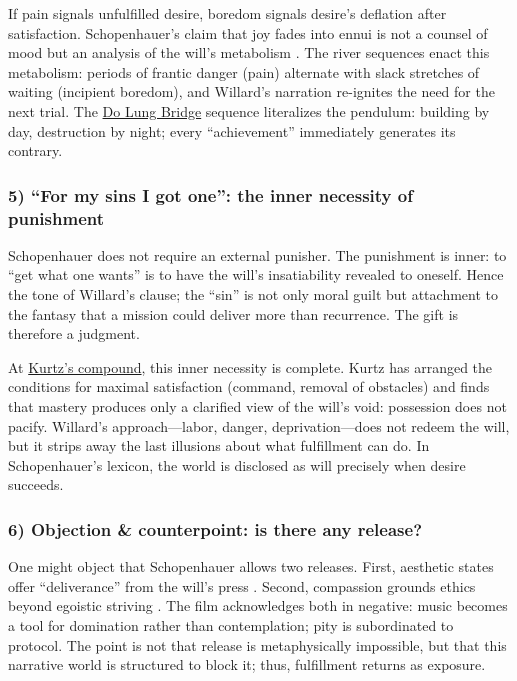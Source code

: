 If pain signals unfulfilled desire, boredom signals desire's deflation after satisfaction.
Schopenhauer's claim that joy fades into ennui is not a counsel of mood but an analysis
of the will's metabolism \parencite[pp.~312--320]{SchopenhauerWWR1969}. The river sequences
enact this metabolism: periods of frantic danger (pain) alternate with slack stretches of
waiting (incipient boredom), and Willard's narration re-ignites the need for the next trial.
The \hyperref[scene:do-lung-bridge]{Do Lung Bridge} sequence literalizes the pendulum:
building by day, destruction by night; every ``achievement'' immediately generates its
contrary.

\subsubsection*{5) ``For my sins I got one'': the inner necessity of punishment}

Schopenhauer does not require an external punisher. The punishment is inner: to ``get what one
wants'' is to have the will's insatiability revealed to oneself. Hence the tone of Willard's
clause; the ``sin'' is not only moral guilt but attachment to the fantasy that a mission could
deliver more than recurrence. The gift is therefore a judgment.

At \hyperref[scene:kurtz-compound]{Kurtz's compound}, this inner necessity is complete. Kurtz
has arranged the conditions for maximal satisfaction (command, removal of obstacles) and finds
that mastery produces only a
clarified view of the will's void: possession does not pacify. Willard's approach—labor, danger,
deprivation—does not redeem the will, but it strips away the last illusions about what
fulfillment can do. In Schopenhauer's lexicon, the world is disclosed as will precisely when
desire succeeds.

\subsubsection*{6) Objection \& counterpoint: is there any release?}

One might object that Schopenhauer allows two releases. First, aesthetic states offer
``deliverance'' from the will's press \parencite[p.~178]{SchopenhauerWWR1969}. Second,
compassion grounds ethics beyond egoistic striving \parencite[pp.~372--374]{SchopenhauerWWR1969}.
The film acknowledges both in negative: music becomes a tool for domination rather than
contemplation; pity is subordinated to protocol. The point is not that release is metaphysically
impossible, but that this narrative world is structured to block it; thus, fulfillment returns
as exposure.

